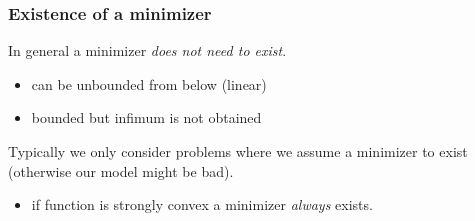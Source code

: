 \documentclass{beamer}
\begin{document}
\begin{frame}
  \frametitle{Existence of a minimizer}

  In general a minimizer \textit{does not need to exist}.
  \begin{itemize}
    \item can be unbounded from below (linear)
    \item bounded but infimum is not obtained
  \end{itemize}
  \begin{center}
  \end{center}

  Typically we only consider problems where we assume a minimizer to exist (otherwise our model might be bad).

  \begin{itemize}
    \item if function is strongly convex a minimizer \textit{always} exists.
  \end{itemize}

\end{frame}
\end{document}
